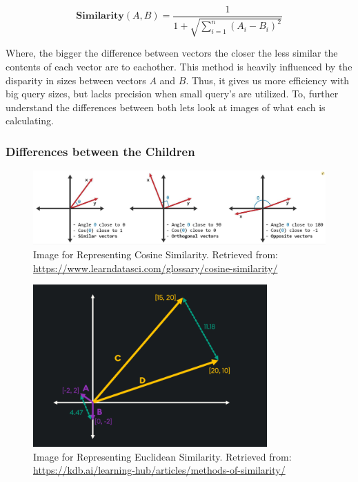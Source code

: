 \documentclass{article}
\begin{document}
\begin{center}
    \[
    \textbf{Similarity}(A, B) = \frac{1}{1 + \sqrt{\sum_{i=1}^{n} (A_i - B_i)^2}}
    \]
\end{center}

\indent Where, the bigger the difference between vectors the closer the less similar the contents of each vector are to eachother. This method is heavily influenced by the disparity in sizes between vectors $A$ and $B$. Thus, it gives us more efficiency with big query sizes, but lacks precision when small query's are utilized. To, further understand the differences between both lets look at images of what each is calculating.

\subsubsection{Differences between the Children}
\begin{figure}[H]
    \centering
    \includegraphics[width=\textwidth]{Image_CosineSimilarity.png}
    \caption{Image for Representing Cosine Similarity. Retrieved from: \url{https://www.learndatasci.com/glossary/cosine-similarity/}}
    \label{fig:CosineSimilarity}
\end{figure}
\begin{figure}[H]
    \centering
    \includegraphics[width=0.8\textwidth]{Image_EuclideanSimilarity.png}
    \caption{Image for Representing Euclidean Similarity. Retrieved from: \url{https://kdb.ai/learning-hub/articles/methods-of-similarity/}}
    \label{fig:EuclideanSimilarity}
\end{figure}
\end{document}

